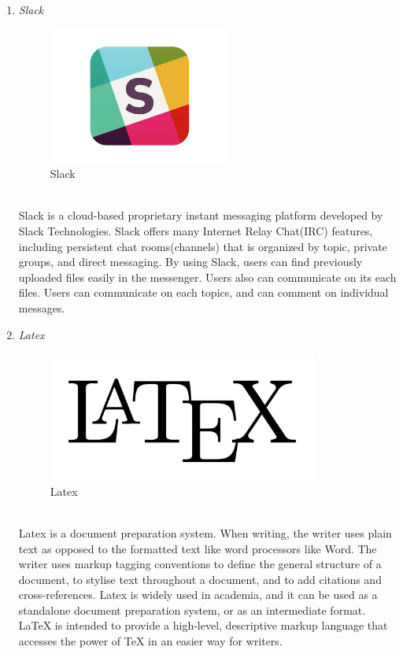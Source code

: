 \documentclass[conference]{IEEEtran}
\begin{document}
\begin{enumerate}
   \item \textit{Slack }
                \begin{figure}[htbp]
	\centerline{\includegraphics[width=60mm, scale=0.5]{fig/slack.png}}
	\caption{Slack}
	\label{fig}
	\end{figure}
   \\Slack is a cloud-based proprietary instant messaging platform developed by Slack Technologies. Slack offers many Internet Relay Chat(IRC) features, including persistent chat rooms(channels) that is organized by topic, private groups, and direct messaging. By using Slack, users can find previously uploaded files easily in the messenger. Users also can communicate on its each files. Users can communicate on each topics, and can comment on individual messages.\\
   \item \textit{Latex }
                   \begin{figure}[htbp]
	\centerline{\includegraphics[width=89mm, scale=0.5]{fig/latex.png}}
	\caption{Latex}
	\label{fig}
	\end{figure}
   \\Latex is a document preparation system. When writing, the writer uses plain text as opposed to the formatted text like word processors like Word. The writer uses markup tagging conventions to define the general structure of a document, to stylise text throughout a document, and to add citations and cross-references. Latex is widely used in academia, and it can be used as a standalone document preparation system, or as an intermediate format. LaTeX is intended to provide a high-level, descriptive markup language that accesses the power of TeX in an easier way for writers.\\

\end{enumerate}
\end{document}

